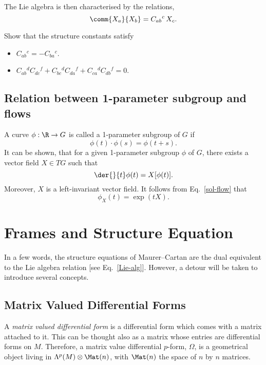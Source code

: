 The Lie algebra is then characterised by the relations,
\begin{equation}
  \comm{X_a}{X_b} = C_{ab}{}^c\, X_c .
  \label{Lie-alg}
\end{equation}

\begin{WEbox}
  Show that the structure constants satisfy 
  \begin{itemize}
  \item $C_{ab}{}^c = - C_{ba}{}^c$.
  \item $C_{ab}{}^d C_{dc}{}^f + C_{bc}{}^d C_{da}{}^f + C_{ca}{}^d C_{db}{}^f = 0$.
  \end{itemize}
\end{WEbox}


\subsection{Relation between 1-parameter subgroup and flows}

A curve $\phi: \R \to G$ is called a 1-parameter subgroup of $G$ if
\begin{equation*}
  \phi(t) \cdot \phi(s) = \phi(t+s).
\end{equation*}
It can be shown, that for a given 1-parameter subgroup $\phi$ of $G$, there exists a vector field $X \in TG$ such that 
\begin{equation*}
  \der{}{t} \phi(t) = X[\phi(t)].
\end{equation*}
Moreover, $X$ is a left-invariant vector field. It follows from Eq.~\eqref{sol-flow} that
\begin{equation}
  \phi_X(t) = \exp(t X).
\end{equation}

\section{Frames and Structure Equation}

In a few words, the structure equations of Maurer--Cartan are the dual equivalent to the Lie algebra relation [see Eq.~\eqref{Lie-alg}]. However, a detour will be taken to introduce several concepts.

\subsection{Matrix Valued Differential Forms}

A \emph{matrix valued differential form} is a  differential form which comes with a matrix attached to it. This can be thought also as a matrix whose entries are differential forms on $M$. Therefore, a matrix value differential $p$-form, $\Omega$, is a geometrical object living in \mbox{$\Lambda^p(M) \otimes \Mat(n)$,} with $\Mat(n)$ the space of $n$ by $n$ matrices.


